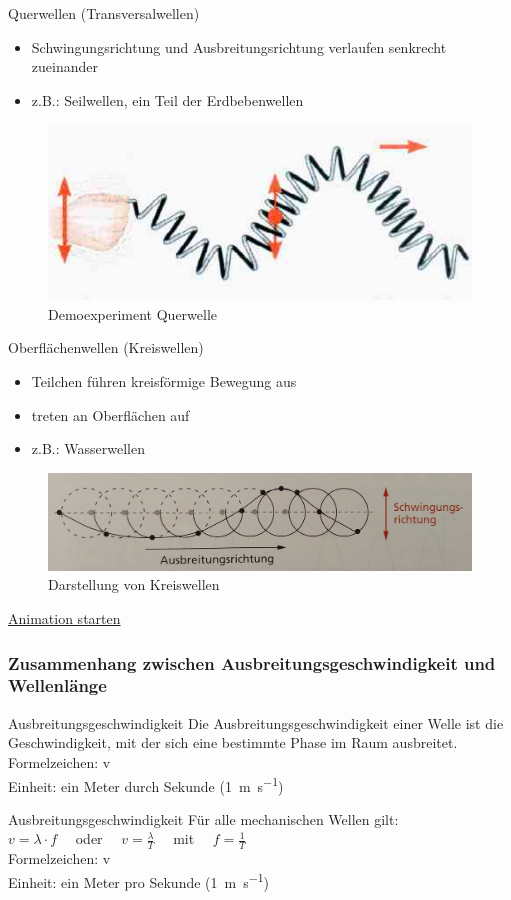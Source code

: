 \documentclass{beamer}
\begin{document}
{	\begin{block}{Querwellen (Transversalwellen)}
	\begin{itemize}
	\item Schwingungsrichtung und Ausbreitungsrichtung verlaufen senkrecht zueinander
	\item z.B.: Seilwellen, ein Teil der Erdbebenwellen
	\end{itemize}
	\end{block}
	\begin{figure}
	\includegraphics[scale=0.3]{Querwelle}
	\caption{Demoexperiment Querwelle}
	\end{figure}
	\begin{block}{Oberflächenwellen (Kreiswellen)}
	\begin{itemize}
	\item Teilchen führen kreisförmige Bewegung aus
	\item treten an Oberflächen auf
	\item z.B.: Wasserwellen
	\end{itemize}
	\end{block}
	\begin{figure}
		\includegraphics[scale=0.1]{kreiswellen.jpg}
		\caption{Darstellung von Kreiswellen}
	\end{figure}
	\href{wasser.gif}{Animation starten}
}

\frame
{
  \frametitle{Zusammenhang zwischen Ausbreitungsgeschwindigkeit und Wellenlänge}
	\begin{block}{Ausbreitungsgeschwindigkeit}
	Die Ausbreitungsgeschwindigkeit einer Welle ist die Geschwindigkeit, mit der sich eine bestimmte Phase im Raum ausbreitet.\\
	Formelzeichen: v\\
	Einheit: ein Meter durch Sekunde (\SI{1}{\meter\per\second})
	\end{block}
	\begin{block}{Ausbreitungsgeschwindigkeit}
	Für alle mechanischen Wellen gilt:\\
	$v=\lambda\cdot f\quad$ oder $\quad v=\frac{\lambda}{T}\quad$ mit $\quad f=\frac{1}{T}$\\
	Formelzeichen: v\\
	Einheit: ein Meter pro Sekunde (\SI{1}{\meter\per\second})
	\end{block}	
}
\end{document}
